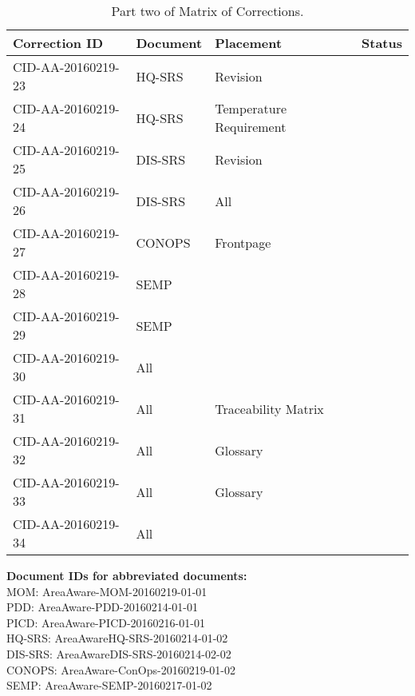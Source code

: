 \begin{table}[ht]
\centering
\begin{tabular}{|>{\centering\arraybackslash}p{4.5cm}|>{\centering\arraybackslash}p{2cm}|>{\centering\arraybackslash}p{3cm}|>{\centering\arraybackslash}p{3cm}|}
\hline \textbf{Correction ID} & \textbf{Document} & \textbf{Placement} & \textbf{Status} \\ 
\hline CID-AA-20160219-23 & HQ-SRS & Revision & \\ 
\hline CID-AA-20160219-24 & HQ-SRS & Temperature Requirement & \\ 
\hline CID-AA-20160219-25 & DIS-SRS & Revision & \\ 
\hline CID-AA-20160219-26 & DIS-SRS & All & \\ 
\hline CID-AA-20160219-27 & CONOPS & Frontpage & \\ 
\hline CID-AA-20160219-28 & SEMP &  & \\ 
\hline CID-AA-20160219-29 & SEMP &  & \\ 
\hline CID-AA-20160219-30 & All &  & \\ 
\hline CID-AA-20160219-31 & All & Traceability Matrix & \\ 
\hline CID-AA-20160219-32 & All & Glossary & \\ 
\hline CID-AA-20160219-33 & All & Glossary & \\ 
\hline CID-AA-20160219-34 & All &  & \\
\hline 
\end{tabular}
\caption{Part two of Matrix of Corrections.}
\label{tb:MoC2} 
\end{table}

\vspace{20pt}
\noindent \textbf{Document IDs for abbreviated documents:}\\
MOM:		AreaAware-MOM-20160219-01-01\\
PDD:		AreaAware-PDD-20160214-01-01\\
PICD:		AreaAware-PICD-20160216-01-01\\
HQ-SRS:		AreaAwareHQ-SRS-20160214-01-02\\
DIS-SRS:	AreaAwareDIS-SRS-20160214-02-02\\
CONOPS:		AreaAware-ConOps-20160219-01-02\\
SEMP:		AreaAware-SEMP-20160217-01-02\\

